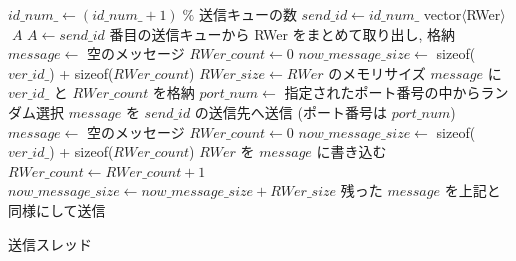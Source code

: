 \begin{algorithm}[t!]
\DontPrintSemicolon
\nl {} {
\nl     $id\_num\_ \leftarrow (id\_num\_ + 1)\; \%$ 送信キューの数\;}
\nl $send\_id \leftarrow id\_num\_$\;
\nl vector$\langle$RWer$\rangle$ $\; A$\;
\nl $A \leftarrow send\_id$ 番目の送信キューから RWer をまとめて取り出し, 格納\;
\nl $message \leftarrow$ 空のメッセージ\;
\nl $RWer\_count \leftarrow 0$\;
\nl $now\_message\_size \leftarrow $ sizeof($ver\_id\_$) + sizeof($RWer\_count$)\;
\nl {} {
\nl     $RWer\_size \leftarrow RWer$ のメモリサイズ\;
\nl     {} {
\nl         $message$ に $ver\_id\_$ と $RWer\_count$ を格納\;
\nl         $port\_num \leftarrow$ 指定されたポート番号の中からランダム選択\;
\nl         $message$ を $send\_id$ の送信先へ送信 (ポート番号は $port\_num$)\;
\nl         $message \leftarrow$ 空のメッセージ\;
\nl         $RWer\_count \leftarrow 0$\;
\nl         $now\_message\_size \leftarrow $ sizeof($ver\_id\_$) + sizeof($RWer\_count$)\;}
\nl     $RWer$ を $message$ に書き込む\;
\nl     $RWer\_count \leftarrow RWer\_count + 1$\;
\nl     $now\_message\_size \leftarrow now\_message\_size + RWer\_size$\;}
\nl {} {
\nl     残った $message$ を上記と同様にして送信\;}
\caption{{送信スレッド} \label{送信スレッド}}
\end{algorithm}